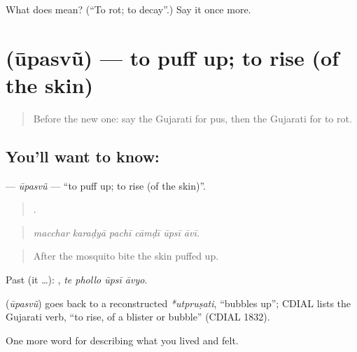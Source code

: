 \begin{tcolorbox}[breakable,colback=teal!4,colframe=teal!35!black,title={Before you move on}]
What does  mean? (\textquotedblleft{}To rot; to decay\textquotedblright{}.) Say it once more.
\end{tcolorbox}
\section[\texorpdfstring{\gu{ઊપસવું} (ūpasvũ)}{ઊપસવું (ūpasvũ)}]{ (ūpasvũ) — to puff up; to rise (of the skin)}

\label{lesson:GU-C480-upasvu}



\begin{quote}
Before the new one: say the Gujarati for pus, then the Gujarati for to rot.
\end{quote}

\subsection*{You'll want to know: }
\textbf{} — \emph{ūpasvũ} — \textquotedblleft{}to puff up; to rise (of the skin)\textquotedblright{}.

\begin{quote}
     .
\end{quote}

\begin{quote}
\emph{macchar karaḍyā pachī cāmḍī ūpsī āvī.}
\end{quote}

\begin{quote}
After the mosquito bite the skin puffed up.
\end{quote}

Past (it …):    , \emph{te phollo ūpsī āvyo}.

\begin{cousinweb}
\textbf{} (\emph{ūpasvũ}) goes back to a reconstructed \emph{*utpruṣati}, \textquotedblleft{}bubbles up\textquotedblright{}; CDIAL lists the Gujarati verb, \textquotedblleft{}to rise, of a blister or bubble\textquotedblright{} (CDIAL 1832).
\end{cousinweb}

\begin{grammarlens}[title={What you've built}]
One more word for describing what you lived and felt.
\end{grammarlens}

